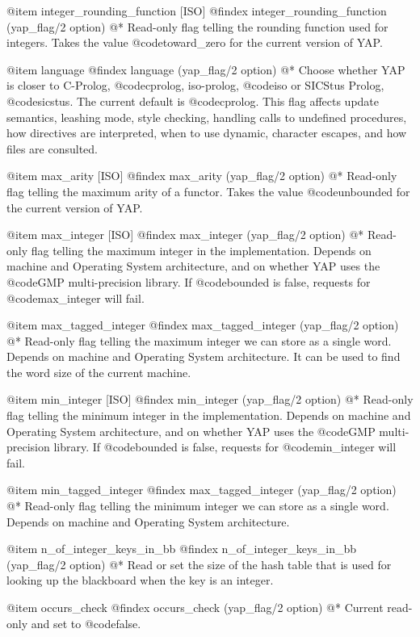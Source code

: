 {{{{{{{{{@item integer_rounding_function [ISO]
@findex integer_rounding_function (yap_flag/2 option)
@*
Read-only flag telling the rounding function used for integers. Takes the value
@code{toward_zero} for the current version of YAP.

@item language
@findex language (yap_flag/2 option)
@* 
Choose whether YAP is closer to C-Prolog, @code{cprolog}, iso-prolog,
@code{iso} or SICStus Prolog, @code{sicstus}. The current default is
@code{cprolog}. This flag affects update semantics, leashing mode,
style checking, handling calls to undefined procedures, how directives
are interpreted, when to use dynamic, character escapes, and how files
are consulted.

@item max_arity [ISO]
@findex max_arity (yap_flag/2 option)
@*
Read-only flag telling the maximum arity of a functor. Takes the value
@code{unbounded} for the current version of YAP.

@item max_integer [ISO]
@findex max_integer (yap_flag/2 option)
@*
Read-only flag telling the maximum integer in the
implementation. Depends on machine and Operating System
architecture, and on whether YAP uses the @code{GMP} multi-precision
library. If @code{bounded} is false, requests for @code{max_integer}
will fail.

@item max_tagged_integer 
@findex max_tagged_integer (yap_flag/2 option)
@*
Read-only flag telling the maximum integer we can store as a single
word. Depends on machine and Operating System
architecture. It can be used to find the word size of the current machine.

@item min_integer [ISO]
@findex min_integer (yap_flag/2 option)
@* Read-only flag telling the minimum integer in the
implementation. Depends on machine and Operating System architecture,
and on whether YAP uses the @code{GMP} multi-precision library. If
@code{bounded} is false, requests for @code{min_integer} will fail.

@item min_tagged_integer 
@findex max_tagged_integer (yap_flag/2 option)
@*
Read-only flag telling the minimum integer we can store as a single
word. Depends on machine and Operating System
architecture.

@item n_of_integer_keys_in_bb
@findex n_of_integer_keys_in_bb (yap_flag/2 option)
@*
Read or set the size of the hash table that is used for looking up the
blackboard when the key is an integer.

@item occurs_check
@findex occurs_check (yap_flag/2 option)
@*
Current read-only and set to @code{false}.

}}}}}}}}}
